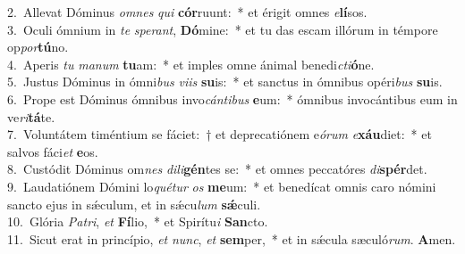 {2.~}Allevat Dóminus \textit{om}\textit{nes} \textit{qui} \textbf{cór}ruunt:~* et érigit omnes \textit{e}\textbf{lí}sos.\\
{3.~}Oculi ómnium in \textit{te} \textit{spe}\textit{rant}, \textbf{Dó}mine:~* et tu das escam illórum in témpore op\textit{por}\textbf{tú}no.\\
{4.~}Aperis \textit{tu} \textit{ma}\textit{num} \textbf{tu}am:~* et imples omne ánimal benedi\textit{cti}\textbf{ó}ne.\\
{5.~}Justus Dóminus in ómni\textit{bus} \textit{vi}\textit{is} \textbf{su}is:~* et sanctus in ómnibus opéri\textit{bus} \textbf{su}is.\\
{6.~}Prope est Dóminus ómnibus invo\textit{cán}\textit{ti}\textit{bus} \textbf{e}um:~* ómnibus invocántibus eum in ve\textit{ri}\textbf{tá}te.\\
{7.~}Voluntátem timéntium se fáciet:~† et deprecatiónem e\textit{ó}\textit{rum} \textit{e}\textbf{xáu}diet:~* et salvos fáci\textit{et} \textbf{e}os.\\
{8.~}Custódit Dóminus om\textit{nes} \textit{di}\textit{li}\textbf{gén}tes se:~* et omnes peccatóres \textit{di}\textbf{spér}det.\\
{9.~}Laudatiónem Dómini lo\textit{qué}\textit{tur} \textit{os} \textbf{me}um:~* et benedícat omnis caro nómini sancto ejus in sǽculum, et in sǽcu\textit{lum} \textbf{sǽ}culi.\\
{10.~}Glória \textit{Pa}\textit{tri}, \textit{et} \textbf{Fí}lio,~* et Spirítu\textit{i} \textbf{San}cto.\\
{11.~}Sicut erat in princípio, \textit{et} \textit{nunc}, \textit{et} \textbf{sem}per,~* et in sǽcula sæculó\textit{rum}. \textbf{A}men.\\
